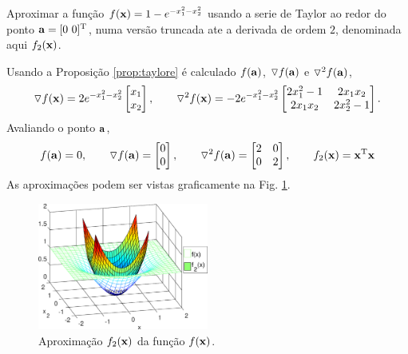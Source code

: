 \begin{example}
Aproximar a função $f(\VECTOR{x})=1-e^{-x_1^2-x_2^2}$ usando a serie de Taylor ao redor do ponto $\VECTOR{a}=[0~ 0]^{\transpose}$,
numa versão truncada ate a derivada de ordem $2$,
denominada aqui $f_2(\VECTOR{x})$.
\end{example}
\begin{SolutionT}
Usando a Proposição \ref{prop:taylore} é calculado $f(\VECTOR{a})$, 
$\triangledown f(\VECTOR{a})$ e $\triangledown^2 f(\VECTOR{a})$,
\begin{equation}
\triangledown f(\VECTOR{x}) = 
2 e^{-x_1^2-x_2^2}
\begin{bmatrix}
x_1 \\
x_2
\end{bmatrix},
\qquad 
\triangledown^2 f(\VECTOR{x}) = 
-2 e^{-x_1^2-x_2^2}
\begin{bmatrix}
2 x_1^2-1 & 2 x_1 x_2\\
2 x_1 x_2 & 2 x_2^2-1
\end{bmatrix}.
\end{equation}
Avaliando o ponto $\VECTOR{a}$,
\begin{equation}
f(\VECTOR{a})=0,
\qquad 
\triangledown f(\VECTOR{a}) = 
\begin{bmatrix}
0 \\
0
\end{bmatrix},
\qquad 
\triangledown^2 f(\VECTOR{a}) = 
\begin{bmatrix}
2 & 0\\
0 & 2
\end{bmatrix},
\qquad 
f_2(\VECTOR{x}) = 
\VECTOR{x}^{\transpose}\VECTOR{x}
\end{equation}
As aproximações podem ser vistas graficamente na Fig. \ref{fig:taylorf}.
\end{SolutionT}


\begin{figure}[!h]
  \centering
    \includegraphics[width=0.5\textwidth]{chapters/funcoes/mcode/taylorR2R1/taylorf.eps}
  \caption{Aproximação $f_2(\VECTOR{x})$ da função $f(\VECTOR{x})$.}
    \label{fig:taylorf}
\end{figure}
 
